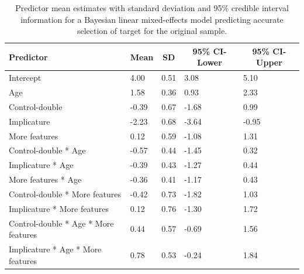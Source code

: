 \documentclass[mask,man]{apa6}
\begin{document}
\begin{table}[tbp]
\begin{center}
\begin{threeparttable}
\caption{\label{tab:brmaccSample1}Predictor mean estimates with standard deviation and 95\% credible interval information for a Bayesian linear mixed-effects model predicting accurate selection of target for the original sample.}
\begin{tabular}{lllll}
\toprule
Predictor & \multicolumn{1}{c}{Mean} & \multicolumn{1}{c}{SD} & \multicolumn{1}{c}{95\% CI-Lower} & \multicolumn{1}{c}{95\% CI-Upper}\\
\midrule
Intercept & 4.00 & 0.51 & 3.08 & 5.10\\
Age & 1.58 & 0.36 & 0.93 & 2.33\\
Control-double & -0.39 & 0.67 & -1.68 & 0.99\\
Implicature & -2.23 & 0.68 & -3.64 & -0.95\\
More features & 0.12 & 0.59 & -1.08 & 1.31\\
Control-double * Age & -0.57 & 0.44 & -1.45 & 0.32\\
Implicature * Age & -0.39 & 0.43 & -1.27 & 0.44\\
More features * Age & -0.36 & 0.41 & -1.17 & 0.43\\
Control-double * More features & -0.42 & 0.73 & -1.82 & 1.03\\
Implicature * More features & 0.12 & 0.76 & -1.30 & 1.72\\
Control-double * Age * More features & 0.44 & 0.57 & -0.69 & 1.56\\
Implicature * Age * More features & 0.78 & 0.53 & -0.24 & 1.84\\
\bottomrule
\end{tabular}
\end{threeparttable}
\end{center}
\end{table}
\end{document}
